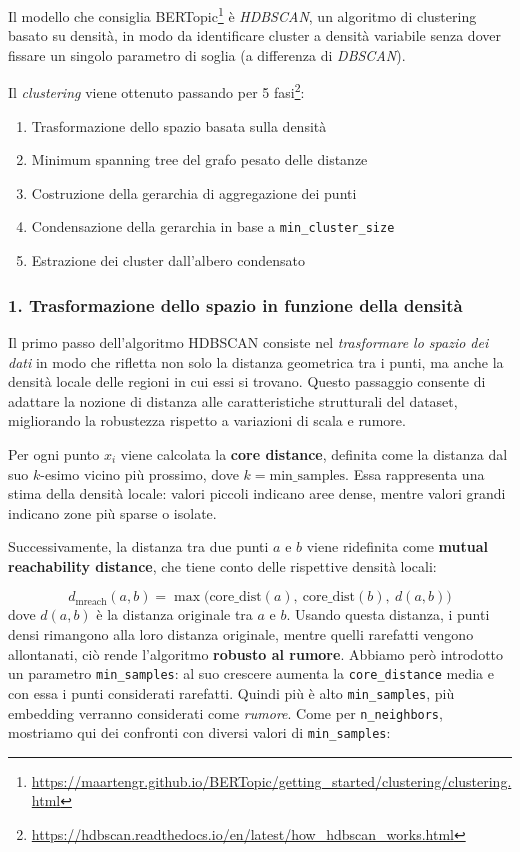 \noindent Il modello che consiglia BERTopic\footnote{\url{https://maartengr.github.io/BERTopic/getting_started/clustering/clustering.html}} è \textit{HDBSCAN}, un algoritmo di clustering basato su densità, in modo da identificare cluster a densità variabile senza dover fissare un singolo parametro di soglia (a differenza di \textit{DBSCAN}).

\noindent Il \textit{clustering} viene ottenuto passando per 5 fasi\footnote{\url{https://hdbscan.readthedocs.io/en/latest/how_hdbscan_works.html}}:
\begin{enumerate}
    \item Trasformazione dello spazio basata sulla densità
    \item Minimum spanning tree del grafo pesato delle distanze
    \item Costruzione della gerarchia di aggregazione dei punti
    \item Condensazione della gerarchia in base a \texttt{min\_cluster\_size}
    \item Estrazione dei cluster dall'albero condensato
\end{enumerate}
\subsubsection*{1. Trasformazione dello spazio in funzione della densità}

Il primo passo dell'algoritmo HDBSCAN consiste nel \textit{trasformare lo spazio dei dati} in modo che rifletta non solo la distanza geometrica tra i punti, ma anche la densità locale delle regioni in cui essi si trovano. 
Questo passaggio consente di adattare la nozione di distanza alle caratteristiche strutturali del dataset, migliorando la robustezza rispetto a variazioni di scala e rumore.

Per ogni punto \( x_i \) viene calcolata la \textbf{core distance}, definita come la distanza dal suo \( k\)-esimo vicino più prossimo, dove \( k = \text{min\_samples} \). 
Essa rappresenta una stima della densità locale: valori piccoli indicano aree dense, mentre valori grandi indicano zone più sparse o isolate.

Successivamente, la distanza tra due punti \( a \) e \( b \) viene ridefinita come \textbf{mutual reachability distance}, che tiene conto delle rispettive densità locali:

\[
d_{\text{mreach}}(a,b) = \max \big( \text{core\_dist}(a),\ \text{core\_dist}(b),\ d(a,b) \big)
\]
dove $d(a,b)$ è la distanza originale tra $a$ e $b$. Usando questa distanza, i punti densi rimangono alla loro distanza originale, mentre quelli rarefatti vengono allontanati, ciò rende l'algoritmo \textbf{robusto al rumore}.
Abbiamo però introdotto un parametro \texttt{min\_samples}: al suo crescere aumenta la \texttt{core\_distance} media e con essa i punti considerati rarefatti.
Quindi più è alto \texttt{min\_samples}, più embedding verranno considerati come \textit{rumore}.
Come per \texttt{n\_neighbors}, mostriamo qui dei confronti con diversi valori di \texttt{min\_samples}:

